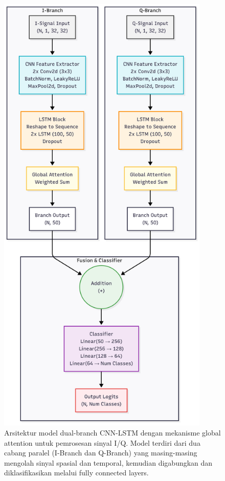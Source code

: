 \documentclass{article}
\begin{document}
\begin{figure}[H]
    \centerline{\includegraphics[width=0.9\textwidth,height=0.8\textheight]{Model/CNN_LSTM_Standard.png}}
    \caption{Arsitektur model dual-branch CNN-LSTM dengan mekanisme global attention untuk pemrosesan sinyal I/Q. Model terdiri dari dua cabang paralel (I-Branch dan Q-Branch) yang masing-masing mengolah sinyal spasial dan temporal, kemudian digabungkan dan diklasifikasikan melalui fully connected layers.}
    \label{fig:architecture_standard}
\end{figure}
\end{document}
